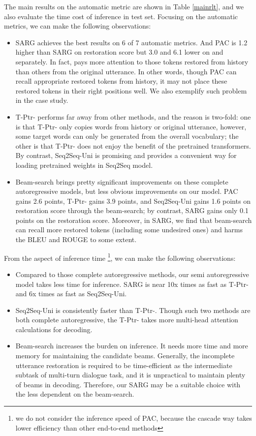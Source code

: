 The main results on the automatic metric are shown in Table \ref{mainrlt}, and we also evaluate the time cost of inference in test set. Focusing on the automatic metrics, we can make the following observations:
\begin{itemize}
	\item SARG achieves the best results on 6 of 7 automatic metrics. And PAC is 1.2 higher than SARG on restoration  score but 3.0 and 6.1 lower on  and  separately. In fact,  pays more attention to those tokens restored from history than others from the original utterance. In other words, though PAC can recall appropriate restored tokens from history, it may not place these restored tokens in their right positions well. We also exemplify such problem in the case study.


	\item T-Ptr- performs far away from other methods, and the reason is two-fold: one is that T-Ptr- only copies words from history or original utterance, however, some target words can only be generated from the overall vocabulary; the other is that T-Ptr- does not enjoy the benefit of the pretrained transformers. By contrast,  Seq2Seq-Uni is promising and provides a convenient way for loading pretrained weights in Seq2Seq model.
	
	\item Beam-search brings pretty significant improvements on these complete autoregressive models, but less obvious improvements on our model. PAC gains 2.6 points, T-Ptr- gains 3.9 points, and Seq2Seq-Uni gains 1.6 points on restoration  score through the beam-search; by contrast, SARG gains only 0.1 points on the restoration  score. Moreover, in SARG, we find that beam-search can recall more restored tokens (including some undesired ones) and harms the BLEU and ROUGE to some extent.
\end{itemize} 

From the aspect of inference time \footnote{we do not consider the inference speed of PAC, because the cascade way takes lower efficiency than other end-to-end methods}, we can make the following observations:
\begin{itemize}
	\item Compared to those complete autoregressive methods, our semi autoregressive model takes less time for inference. SARG is near 10x times as fast as T-Ptr- and 6x times as fast as Seq2Seq-Uni.
	\item Seq2Seq-Uni is consistently faster than T-Ptr-. Though such two methods are both complete autoregressive, the T-Ptr- takes more multi-head attention calculations for decoding.
	\item Beam-search increases the burden on inference. It needs more time and more memory for maintaining the candidate beams. Generally, the incomplete utterance restoration is required to be time-efficient as the intermediate subtask of multi-turn dialogue task, and it is unpractical to maintain plenty of beams in decoding. Therefore, our SARG may be a suitable choice with the less dependent on the beam-search.
\end{itemize}

